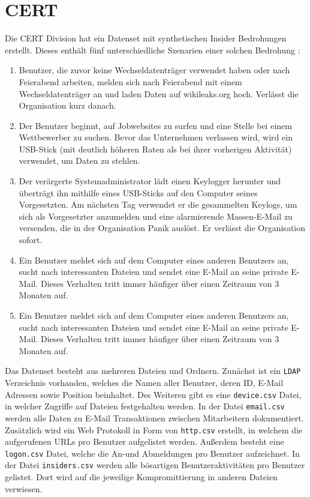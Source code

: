 \documentclass[
    12pt, %
    DIV10,
    ngerman, %
    a4paper, %
    oneside, %
    titlepage, %
    parskip=half, %
    headings=normal, %
    listof=totoc, %
    bibliography=totoc, %
    index=totoc, %
    captions=tableheading, %
    final %
]{scrreprt}
\begin{document}
\section{CERT}
Die CERT Division hat ein Datenset mit synthetischen Insider Bedrohungen erstellt. Dieses enthält fünf unterschiedliche Szenarien einer solchen Bedrohung \parencite{glasser2013bridging}:
\begin{enumerate}
\item Benutzer, die zuvor keine Wechseldatenträger verwendet haben oder nach Feierabend arbeiten, melden sich nach Feierabend mit einem Wechseldatenträger an und laden Daten auf wikileaks.org hoch. Verlässt die Organisation kurz danach.
\item Der Benutzer beginnt, auf Jobwebsites zu surfen und eine Stelle bei einem Wettbewerber zu suchen. Bevor das Unternehmen verlassen wird, wird ein USB-Stick (mit deutlich höheren Raten als bei ihrer vorherigen Aktivität) verwendet, um Daten zu stehlen.
\item Der verärgerte Systemadministrator lädt einen Keylogger herunter und überträgt ihn mithilfe eines USB-Sticks auf den Computer seines Vorgesetzten. Am nächsten Tag verwendet er die gesammelten Keylogs, um sich als Vorgesetzter anzumelden und eine alarmierende Massen-E-Mail zu versenden, die in der Organisation Panik auslöst. Er verlässt die Organisation sofort.
\item Ein Benutzer meldet sich auf dem Computer eines anderen Benutzers an, sucht nach interessanten Dateien und sendet eine E-Mail an seine private E-Mail. Dieses Verhalten tritt immer häufiger über einen Zeitraum von 3 Monaten auf.
\item Ein Benutzer meldet sich auf dem Computer eines anderen Benutzers an, sucht nach interessanten Dateien und sendet eine E-Mail an seine private E-Mail. Dieses Verhalten tritt immer häufiger über einen Zeitraum von 3 Monaten auf.
\end{enumerate}
Das Datenset besteht aus mehreren Dateien und Ordnern. Zunächst ist ein \texttt{LDAP} Verzeichnis vorhanden, welches die Namen aller Benutzer, deren ID, E-Mail Adressen sowie Position beinhaltet. Des Weiteren gibt es eine \texttt{device.csv} Datei, in welcher Zugriffe auf Dateien festgehalten werden. In der Datei \texttt{email.csv} werden alle Daten zu E-Mail Transaktionen zwischen Mitarbeitern dokumentiert. Zusätzlich wird ein Web Protokoll in Form von \texttt{http.csv} erstellt, in welchem die aufgerufenen URLs pro Benutzer aufgelistet werden. Außerdem besteht eine \texttt{logon.csv} Datei, welche die An-und Abmeldungen pro Benutzer aufzeichnet. In der Datei \texttt{insiders.csv} werden alle bösartigen Benutzeraktivitäten pro Benutzer gelistet. Dort wird auf die jeweilige Kompromittierung in anderen Dateien verwiesen.
\end{document}
